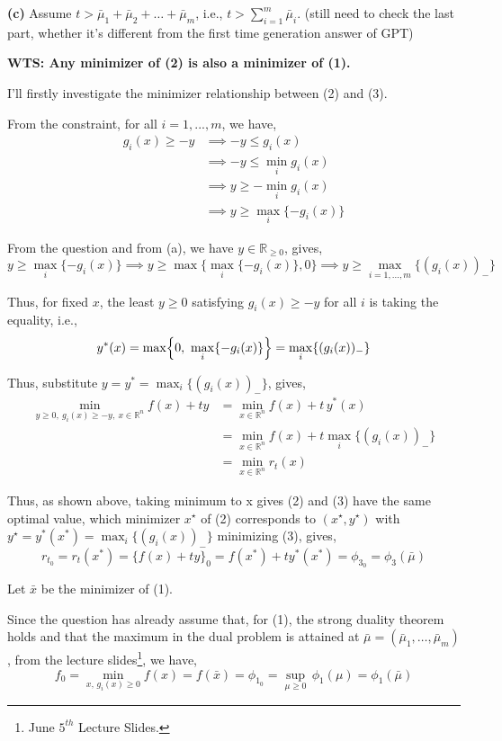 \documentclass[12pt]{article}
\begin{document}
\vspace{10pt}
\noindent
\textbf{(c)} Assume $t>\bar\mu_1+\bar\mu_2+\dots+\bar\mu_m$, i.e., $t > \sum_{i=1}^m \bar \mu_i$. (still need to check the last part, whether it's different from the first time generation answer of GPT)

\textbf{WTS: Any minimizer of (2) is also a minimizer of (1).} 

I'll firstly investigate the minimizer relationship between (2) and (3).

From the constraint, for all $i=1, ..., m$, we have,
\begin{align*}
	g_i(x) \geq -y &\implies  -y \le g_i(x) \\
	&\implies -y\le \min_{i} g_i(x) \\
	&\implies y\ge -\min_{i} g_i(x) \\
	&\implies y\ge \max_{i}\{-g_i(x)\}
\end{align*}

From the question and from (a), we have $y \in \mathbb{R}_{\geq0}$, gives, 
$$y\ge \max_{i}\{-g_i(x)\} \implies y\ge \max\bigl\{\max_{i}\{-g_i(x)\},0\bigr\} \implies y\ge \displaystyle \max_{i=1,\dots,m}\{(g_i(x))_-\}$$

Thus, for fixed $x$, the least $y \ge 0$ satisfying $g_i(x)\ge -y$ for all $i$ is taking the equality, i.e.,
$$
y^*(x)=\max\Bigl\{0,\ \max_i\{-g_i(x)\}\Bigr\}=\max_i\{(g_i(x))_-\}
$$

Thus, substitute $y = y^* = \max_i\{(g_i(x))_-\}$, gives, 
\begin{align*}
	\min_{y\ge0,\ g_i(x)\ge -y,\ x\in \mathbb{R}^n}f(x)+ty &= \min_{x\in \mathbb{R}^n}f(x)+t\, y^*(x) \\
	&= \min_{x\in \mathbb{R}^n}f(x)+t \max_i\{(g_i(x))_-\} \\
	&= \min_{x\in \mathbb{R}^n} r_t(x)
\end{align*}

Thus, as shown above, taking minimum to x gives (2) and (3) have the same optimal value, which minimizer $x^\star$ of (2) corresponds to $(x^\star,y^\star)$ with $y^\star=y^*(x^*) = \max_{i}\{(g_i(x))_-\}$ minimizing (3), gives,
\begin{equation}\tag{1}
	r_{t_0} = r_t(x^*) = \{f(x)+ty\}_0 = f(x^*)+ty^*(x^*) = \phi_{3_0} = \phi_3(\bar \mu)
\end{equation}

Let $\bar x$ be the minimizer of (1).

Since the question has already assume that, for (1), the strong duality theorem holds and that the maximum in the dual problem is attained at $\bar\mu=(\bar\mu_1,\dots,\bar\mu_m)$, from the lecture slides\footnote{June $5^{th}$ Lecture Slides.}, we have, 
\begin{equation}\tag{2}
f_0=\min_{x,\, g_i(x)\ge 0} f(x)=f(\bar x)=\phi_{1_0}=\sup_{\mu\ge0}\,\phi_1(\mu)=\phi_1(\bar\mu)
\end{equation}
\end{document}
